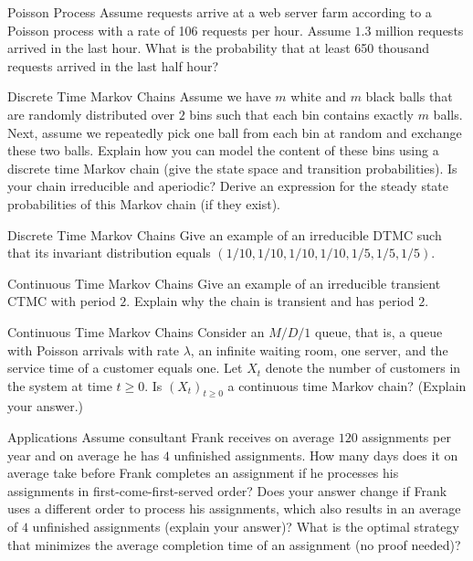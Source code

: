 \begin{problem}{Poisson Process}
Assume requests arrive at a web server farm according to a Poisson process with a rate of 106 requests per hour. Assume $1.3$ million requests arrived in the last hour. What is the probability that at least 650 thousand requests arrived in the last half hour?
\end{problem}

\begin{problem}{Discrete Time Markov Chains}
Assume we have $m$ white and $m$ black balls that are randomly distributed over $2$ bins such that each bin contains exactly $m$ balls. Next, assume we repeatedly pick one ball from each bin at random and exchange these two balls. Explain how you can model the content of these bins using a discrete time Markov chain (give the state space and transition probabilities). Is your chain irreducible and aperiodic? Derive an expression for the steady state probabilities of this Markov chain (if they exist).
\end{problem}

\begin{problem}{Discrete Time Markov Chains}
Give an example of an irreducible DTMC such that
its invariant distribution equals $(1/10, 1/10, 1/10, 1/10, 1/5, 1/5, 1/5)$.
\end{problem}

\begin{problem}{Continuous Time Markov Chains}
Give an example of an irreducible transient CTMC with period $2$. Explain why the chain is transient and has period $2$.
\end{problem}

\begin{problem}{Continuous Time Markov Chains}
Consider an $M/D/1$ queue, that is, a queue with Poisson arrivals with rate $\lambda$, an infinite waiting room, one server, and the service time of a customer equals one. Let $X_t$ denote the number of customers in the system at time $t \geq 0$. Is $(X_t)_{t \geq 0}$ a continuous time Markov chain? (Explain your answer.)
\end{problem}

\begin{problem}{Applications}
Assume consultant Frank receives on average $120$ assignments per year and on average he has $4$ unfinished assignments. How many days does it on average take before Frank completes an assignment if he processes his assignments in first-come-first-served order? Does your answer change if Frank uses a different order to process his assignments, which also results in an average of $4$ unfinished assignments (explain your answer)? What is the optimal strategy that minimizes the average completion time of an assignment (no proof needed)?
\end{problem}

